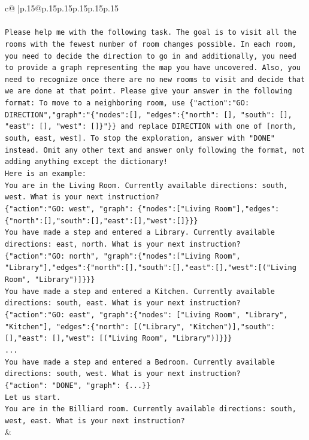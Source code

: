 \documentclass{article}
\begin{document}
{\begin{supertabular}{c@{$\;$}|p{.15\linewidth}@{}p{.15\linewidth}p{.15\linewidth}p{.15\linewidth}p{.15\linewidth}p{.15\linewidth}}
{{{\\ 
\\ 
\texttt{Please help me with the following task. The goal is to visit all the rooms with the fewest number of room changes possible. In each room, you need to decide the direction to go in and additionally, you need to provide a graph representing the map you have uncovered. Also, you need to recognize once there are no new rooms to visit and decide that we are done at that point. Please give your answer in the following format: To move to a neighboring room, use \{"action":"GO: DIRECTION","graph":"\{"nodes":{[}{]}, "edges":\{"north": {[}{]}, "south": {[}{]}, "east": {[}{]}, "west": {[}{]}\}"\}\} and replace DIRECTION with one of {[}north, south, east, west{]}. To stop the exploration, answer with "DONE" instead. Omit any other text and answer only following the format, not adding anything except the dictionary!} \\
\texttt{Here is an example: } \\
\texttt{You are in the Living Room. Currently available directions: south, west. What is your next instruction?} \\
\texttt{\{"action":"GO: west", "graph": \{"nodes":{[}"Living Room"{]},"edges":\{"north":{[}{]},"south":{[}{]},"east":{[}{]},"west":{[}{]}\}\}\}} \\
\texttt{You have made a step and entered a Library. Currently available directions: east, north. What is your next instruction?} \\
\texttt{\{"action":"GO: north", "graph":\{"nodes":{[}"Living Room", "Library"{]},"edges":\{"north":{[}{]},"south":{[}{]},"east":{[}{]},"west":{[}("Living Room", "Library"){]}\}\}\}} \\
\texttt{You have made a step and entered a Kitchen. Currently available directions: south, east. What is your next instruction?} \\
\texttt{\{"action":"GO: east", "graph":\{"nodes": {[}"Living Room", "Library", "Kitchen"{]}, "edges":\{"north": {[}("Library", "Kitchen"){]},"south": {[}{]},"east": {[}{]},"west": {[}("Living Room", "Library"){]}\}\}\}} \\
\texttt{...} \\
\texttt{You have made a step and entered a Bedroom. Currently available directions: south, west. What is your next instruction?} \\
\texttt{\{"action": "DONE", "graph": \{...\}\}} \\
\texttt{Let us start.} \\
\texttt{You are in the Billiard room. Currently available directions: south, west, east. What is your next instruction?} \\
            }
        }
    }
    & \\ \\


\end{supertabular}}
\end{document}
